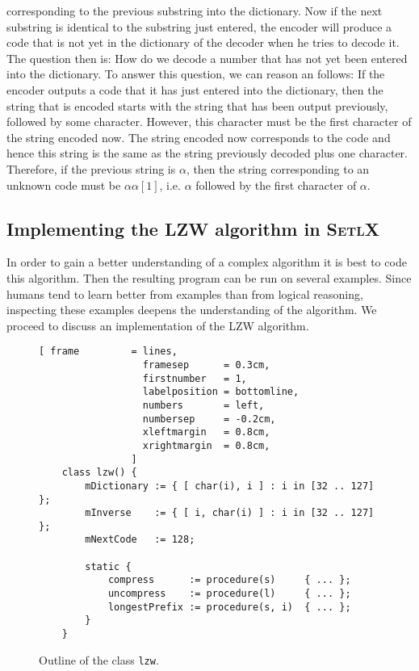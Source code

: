 corresponding to the previous substring into the dictionary.  Now if the next substring is identical
to the substring just entered, the encoder will produce a code that is not yet in the dictionary of
the decoder when he tries to decode it.   The question then is: How do we decode a number that has
not yet been entered into the dictionary.  To answer this question, we can reason an follows:
If the encoder outputs a code that it has just entered into the dictionary, then the string that is
encoded starts with the string that has been output previously, followed by some character.  However,
this character must be the first character of the string encoded now.  The string encoded now
corresponds to the code and hence this string is the same as the string previously decoded plus one
character. Therefore, if the previous string is $\alpha$, then the string
corresponding to an unknown code must be $\alpha \alpha[1]$, i.e. $\alpha$ followed by the first
character of $\alpha$.



\subsection{Implementing the LZW algorithm in \textsc{SetlX}}
In order to gain a better understanding of a complex algorithm it is best to code this algorithm.
Then the resulting program can be run on several examples.  Since humans tend
to learn better from examples than from logical reasoning, inspecting these examples deepens
the understanding of the algorithm.  We proceed to discuss an implementation of the LZW
algorithm.  

\begin{figure}[!ht]
\centering
\begin{Verbatim}[ frame         = lines, 
                  framesep      = 0.3cm, 
                  firstnumber   = 1,
                  labelposition = bottomline,
                  numbers       = left,
                  numbersep     = -0.2cm,
                  xleftmargin   = 0.8cm,
                  xrightmargin  = 0.8cm,
                ]
    class lzw() {
        mDictionary := { [ char(i), i ] : i in [32 .. 127] };
        mInverse    := { [ i, char(i) ] : i in [32 .. 127] };
        mNextCode   := 128;
    
        static {
            compress      := procedure(s)     { ... };
            uncompress    := procedure(l)     { ... };
            longestPrefix := procedure(s, i)  { ... };
        }
    }
\end{Verbatim}
\vspace*{-0.3cm}
\caption{Outline of the class \texttt{lzw}.}
\label{fig:lzw.stlx-outline}
\end{figure}


